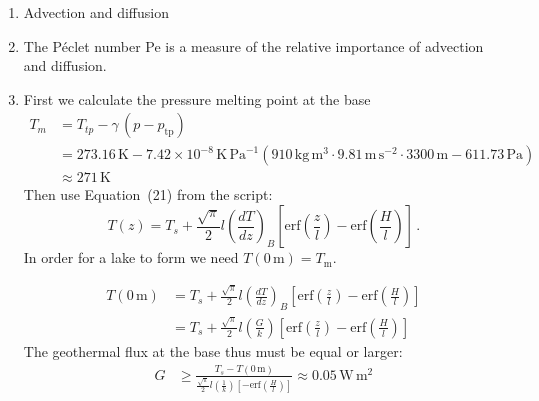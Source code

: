\documentclass[parskip=half]{scrartcl}
\begin{document}
\begin{enumerate}
\item Advection and diffusion
\item The P\'eclet number Pe is a measure of the relative importance of advection and diffusion.
\item First we calculate the pressure melting point at the base
\begin{align*}
 \label{eq:clausius-pure}
 T_m &= T_{tp} - \gamma\, (p - p_{\text{tp}}) \\
 & = 273.16\,\text{K} -  7.42 \times 10^{-8} \,\text{K}\,\text{Pa}^{-1} \left(  910\,\text{kg}\,\text{m}^{3} \cdot 9.81\,\text{m}\,\text{s}^{-2}\cdot 3300\,\text{m}- 611.73\,\text{Pa}\right) \\
 & \approx 271\,\text{K}
\end{align*} Then use Equation~(21) from the script:
\begin{equation*}
  T(z) = T_s + \frac{\sqrt\pi}{2} l \left(\frac{dT}{dz}\right)_{B} 
 \left[ {\textrm{erf}} \left( \frac{z}{l} \right) - {\textrm{erf}} \left( \frac{H}{l} \right) \right]\,.
\end{equation*} In order for a lake to form we need $T(0\,\text{m}) = T_{\text{m}}$.

\begin{align*}
  T(0\,\text{m}) & = T_s + \frac{\sqrt\pi}{2} l \left(\frac{dT}{dz}\right)_{B} 
 \left[ {\textrm{erf}} \left( \frac{z}{l} \right) - {\textrm{erf}} \left( \frac{H}{l} \right) \right] \\
 & = T_s + \frac{\sqrt\pi}{2} l \left(\frac{G}{k}\right) 
 \left[ {\textrm{erf}} \left( \frac{z}{l} \right) - {\textrm{erf}} \left( \frac{H}{l} \right) \right]
\end{align*}
The geothermal flux at the base thus must be equal or larger:
\begin{align*}
 G & \ge \frac{T_s - T(0\,\text{m})}{\frac{\sqrt\pi}{2} l \left(\frac{1}{k}\right) 
 \left[  - {\textrm{erf}} \left( \frac{H}{l} \right) \right]} \approx 0.05\,\text{W}\,\text{m}^{2}
\end{align*}


\end{enumerate}
\end{document}
